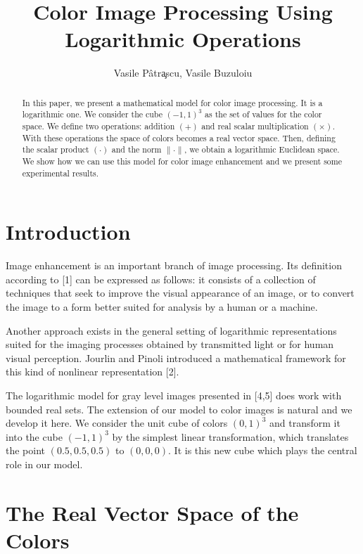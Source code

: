 \documentclass[11pt]{article}
\begin{document}
\title{Color Image Processing Using Logarithmic Operations}
\author{Vasile P\^atr\c{a}scu, Vasile Buzuloiu}
\date{}
\maketitle

\begin{abstract}
In this paper, we present a mathematical model for color image processing. It is a logarithmic one. We consider the cube $(-1,1)^3$ as the set of values for the color space. We define two operations: addition $(+)$ and real scalar multiplication $(\times)$. With these operations the space of colors becomes a real vector space. Then, defining the scalar product $(\cdot)$ and the norm $\|\cdot\|$, we obtain a logarithmic Euclidean space. We show how we can use this model for color image enhancement and we present some experimental results.
\end{abstract}

\section{Introduction}

Image enhancement is an important branch of image processing. Its definition according to [1] can be expressed as follows: it consists of a collection of techniques that seek to improve the visual appearance of an image, or to convert the image to a form better suited for analysis by a human or a machine.

Another approach exists in the general setting of logarithmic representations suited for the imaging processes obtained by transmitted light or for human visual perception. Jourlin and Pinoli introduced a mathematical framework for this kind of nonlinear representation [2].

The logarithmic model for gray level images presented in [4,5] does work with bounded real sets. The extension of our model to color images is natural and we develop it here. We consider the unit cube of colors $(0,1)^3$ and transform it into the cube $(-1,1)^3$ by the simplest linear transformation, which translates the point $(0.5,0.5,0.5)$ to $(0,0,0)$. It is this new cube which plays the central role in our model.

\section{The Real Vector Space of the Colors}
\end{document}
